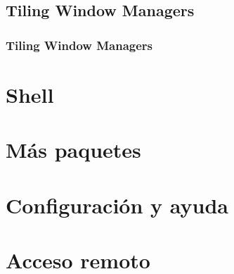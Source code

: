 \documentclass[aspectratio=43]{beamer}
\begin{document}
\subsection{Tiling Window Managers}
\begin{frame}
    \frametitle{Tiling Window Managers}
    
\end{frame}

\section{Shell}

\begin{frame}
    \frametitle{}
    
\end{frame}


\section{Más paquetes}

\begin{frame}
    \frametitle{}
    
\end{frame}


\section{Configuración y ayuda}

\begin{frame}
    \frametitle{}
    
\end{frame}


\section{Acceso remoto}


\begin{frame}
    \frametitle{}
    
\end{frame}
\end{document}
